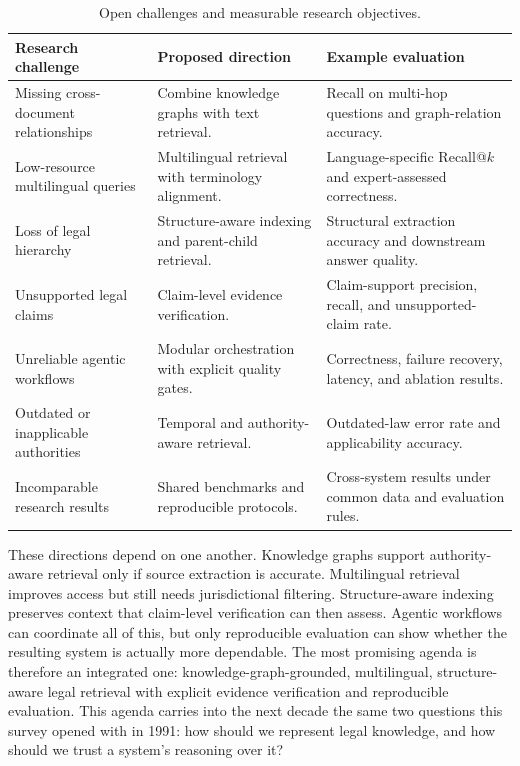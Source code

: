 \begin{table}[tp]
\centering
\caption{Open challenges and measurable research objectives.}
\label{tab:agenda}
\footnotesize
\setlength{\tabcolsep}{5pt}
\renewcommand{\arraystretch}{1.25}
\begin{tabularx}{\textwidth}{>{\raggedright\arraybackslash}p{3.6cm} >{\raggedright\arraybackslash}X >{\raggedright\arraybackslash}X}
\toprule
\textbf{Research challenge} & \textbf{Proposed direction} & \textbf{Example evaluation} \\
\midrule
Missing cross-document relationships & Combine knowledge graphs with text retrieval. & Recall on multi-hop questions and graph-relation accuracy. \\
Low-resource multilingual queries & Multilingual retrieval with terminology alignment. & Language-specific Recall@$k$ and expert-assessed correctness. \\
Loss of legal hierarchy & Structure-aware indexing and parent-child retrieval. & Structural extraction accuracy and downstream answer quality. \\
Unsupported legal claims & Claim-level evidence verification. & Claim-support precision, recall, and unsupported-claim rate. \\
Unreliable agentic workflows & Modular orchestration with explicit quality gates. & Correctness, failure recovery, latency, and ablation results. \\
Outdated or inapplicable authorities & Temporal and authority-aware retrieval. & Outdated-law error rate and applicability accuracy. \\
Incomparable research results & Shared benchmarks and reproducible protocols. & Cross-system results under common data and evaluation rules. \\
\bottomrule
\end{tabularx}
\end{table}

These directions depend on one another. Knowledge graphs support authority-aware retrieval only if
source extraction is accurate. Multilingual retrieval improves access but still needs jurisdictional
filtering. Structure-aware indexing preserves context that claim-level verification can then assess.
Agentic workflows can coordinate all of this, but only reproducible evaluation can show whether the
resulting system is actually more dependable. The most promising agenda is therefore an integrated
one: knowledge-graph-grounded, multilingual, structure-aware legal retrieval with explicit evidence
verification and reproducible evaluation. This agenda carries into the next decade the same two
questions this survey opened with in 1991: how should we represent legal knowledge, and how should
we trust a system's reasoning over it?
